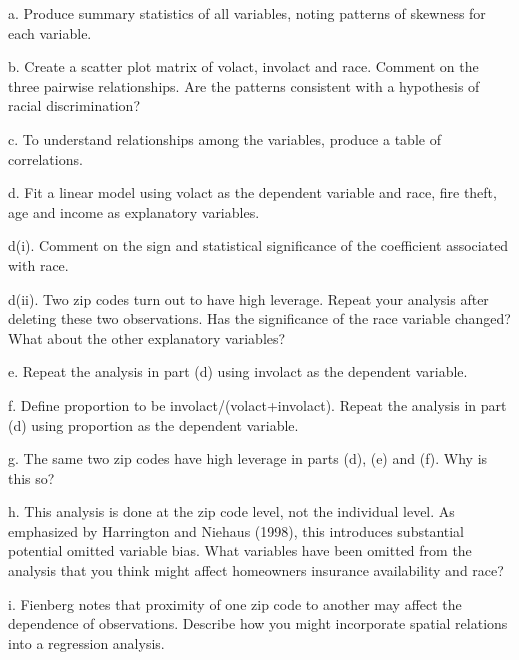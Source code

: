 \begin{exercises}
a. Produce summary statistics of all variables,  noting patterns of
skewness for each variable.

b. Create a scatter plot matrix of volact, involact and race.
Comment on the three pairwise relationships. Are the patterns
consistent with a hypothesis of racial discrimination?

c. To understand relationships among the variables, produce a table
of correlations.

d. Fit a linear model using volact as the dependent variable and
race, fire theft, age and income as explanatory variables.

d(i). Comment on the sign and statistical significance of the
coefficient associated with race.

d(ii). Two zip codes turn out to have high leverage. Repeat your
analysis after deleting these two observations. Has the significance
of the race variable changed? What about the other explanatory
variables?

e. Repeat the analysis in part (d) using involact as the dependent
variable.

f. Define proportion to be involact/(volact+involact). Repeat the
analysis in part (d) using proportion as the dependent variable.

g. The same two zip codes have high leverage in parts (d), (e) and
(f). Why is this so?

h. This analysis is done at the zip code level, not the individual
level. As emphasized by Harrington and Niehaus (1998), this
introduces substantial potential omitted variable bias. What
variables have been omitted from the analysis that you think might
affect homeowners insurance availability and race?

i. Fienberg notes that proximity of one zip code to another may
affect the dependence of observations. Describe how you might
incorporate spatial relations into a regression analysis.



\end{exercises}
